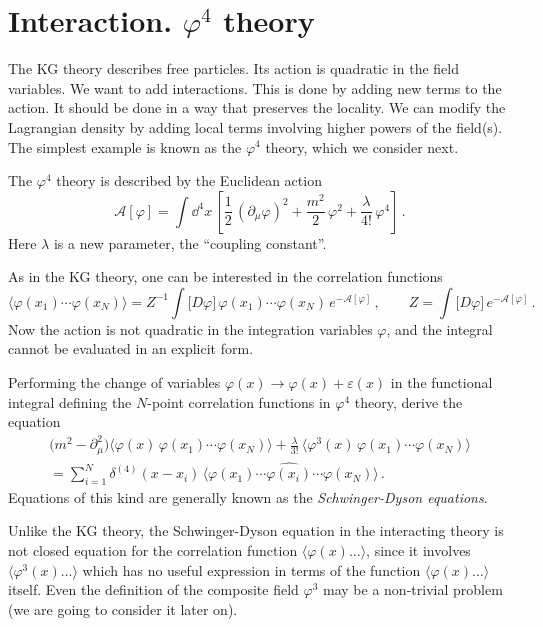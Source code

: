 \section{Interaction. \texorpdfstring{$\varphi^4$}{phi**4} theory}

The KG theory describes free particles. Its action is quadratic in the field
variables. We want to add interactions. This is done by adding new terms to the
action. It should be done in a way that preserves the locality. We can modify
the Lagrangian density by adding local terms involving higher powers of the
field(s). The simplest example is known as the $\varphi^4$ theory, which we
consider next.

The $\varphi^4$ theory is described by the Euclidean action
\[
\mathcal A[\varphi]=\int \dd^4x\,\left[\frac12\,(\partial_\mu\varphi)^2+\frac{m^2}{2}\,\varphi^2+\frac{\lambda}{4!}\,\varphi^4\right]\,.
\]
Here $\lambda$ is a new parameter, the ``coupling constant''.

As in the KG theory, one can be interested in the correlation functions
\[
\bigl\langle\varphi(x_1)\cdots\varphi(x_N)\bigr\rangle=Z^{-1}\int\bigl[D\varphi\bigr]\,\varphi(x_1)\cdots\varphi(x_N)\,e^{-\mathcal A[\varphi]}\,,\qquad
Z=\int\bigl[D\varphi\bigr]\,e^{-\mathcal A[\varphi]}\,.
\]
Now the action is not quadratic in the integration variables $\varphi$, and
the integral cannot be evaluated in an explicit form.

\begin{exercise}
Performing the change of variables $\varphi(x)\to\varphi(x)+\varepsilon(x)$
in the functional integral defining the $N$-point correlation functions in
$\varphi^4$ theory, derive the equation
\begin{multline*}
\bigl(m^2-\partial_\mu^2\bigr)\bigl\langle\varphi(x)\,\varphi(x_1)\cdots\varphi(x_N)\bigr\rangle
+\frac{\lambda}{3!}\,\bigl\langle\varphi^3(x)\,\varphi(x_1)\cdots\varphi(x_N)\bigr\rangle\\
=\sum_{i=1}^N\delta^{(4)}(x-x_i)\,\bigl\langle\varphi(x_1)\cdots\widehat{\varphi(x_i)}\cdots\varphi(x_N)\bigr\rangle\,.
\end{multline*}
Equations of this kind are generally known as the \emph{Schwinger-Dyson
equations}.
\end{exercise}

Unlike the KG theory, the Schwinger-Dyson equation in the interacting theory is
not closed equation for the correlation function $\langle\varphi(x)\dots\rangle$,
since it involves $\langle\varphi^3(x)\dots\rangle$ which has no useful
expression in terms of the function $\langle\varphi(x)\dots\rangle$ itself.
Even the definition of the composite field $\varphi^3$ may be a non-trivial
problem (we are going to consider it later on).

